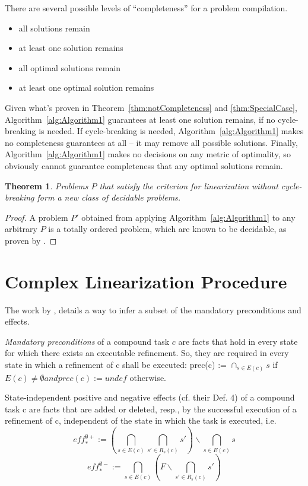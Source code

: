 \documentclass[letterpaper]{article}
\newtheorem{theorem}{Theorem}
\newtheorem{proof}{Proof}
\newcommand{\RelEffPlus} {\ensuremath{\mathit{eff^{\emptyset +}_{*}}}}
\newcommand{\RelEffMinus} {\ensuremath{\mathit{eff^{\emptyset -}_{*}}}}
\begin{document}
There are several possible levels of \enquote{completeness} for a problem compilation.
\begin{itemize}
	\item all solutions remain 
	\item at least one solution remains 
	\item all optimal solutions remain
	\item at least one optimal solution remains 	
\end{itemize}
Given what's proven in Theorem~\ref{thm:notCompleteness} and \ref{thm:SpecialCase}, Algorithm~\ref{alg:Algorithm1} guarantees at least one solution remains, if no cycle-breaking is needed. If cycle-breaking is needed, Algorithm~\ref{alg:Algorithm1} makes no completeness guarantees at all -- it may remove all possible solutions. Finally, Algorithm~\ref{alg:Algorithm1} makes no decisions on any metric of optimality, so obviously cannot guarantee completeness that any optimal solutions remain.


\begin{theorem}\label{thm:newClass}
	Problems $P$ that satisfy the criterion for linearization without cycle-breaking form a new class of decidable problems.
\end{theorem}
\begin{proof}
	A problem $P'$ obtained from applying Algorithm~\ref{alg:Algorithm1} to any arbitrary $P$ is a totally ordered problem, which are known to be decidable, as proven by \cite{Alford2015TightHTNBounds}.  
\end{proof}






\section{Complex Linearization Procedure}

The work by \cite{ConnyPreEff}, details a way to infer a subset of the mandatory preconditions and effects.

\emph{Mandatory preconditions} of a compound task $c$ are facts that hold in every state for which there exists an executable refinement. So, they are required in every state in which a refinement of c shall be executed: prec(c) := $\cap_{s \in E(c)}  s$
if $E(c) \neq \emptyset and prec(c) := undef$ otherwise.

State-independent positive and negative effects (cf. their
Def. 4) of a compound task c are facts that are added or
deleted, resp., by the successful execution of a refinement of
c, independent of the state in which the task is executed, i.e.
$$ \RelEffPlus := ( \bigcap_{s \in E(c)} \bigcap_{s' \in R_s(c)} s') \backslash  \bigcap_{s \in E(c)} s    $$
$$ \RelEffMinus := \bigcap_{s \in E(c)}  (F \backslash \bigcap_{s' \in R_s(c)} s' ) $$
\end{document}
